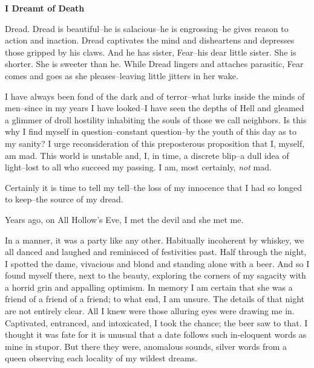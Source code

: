 \documentclass{article}
\begin{document}


\begin{center}
\large\textbf{I Dreamt of Death}
\end{center}



\noindent
Dread.
Dread is beautiful--he is salacious--he is engrossing--he
gives reason to action and inaction.
Dread captivates the mind and disheartens and depresses
those gripped by his claws.
And he has sister, Fear--his dear little sister.
She is shorter.  She is sweeter than he.
While Dread lingers and attaches parasitic,
Fear comes and goes as she pleases--leaving
little jitters in her wake.


I have always been fond of the dark and of terror--what
lurks inside the minds of men--since in my years
I have looked--I have seen the depths of Hell
and gleamed a glimmer of droll hostility
inhabiting the souls of those we call neighbors.
Is this why I find myself in question--constant question--by
the youth of this day as to my sanity?
I urge reconsideration of this preposterous proposition that
I, myself, am mad.
This world is unstable and, I, in time, a discrete blip--a
dull idea of light--lost to all who succeed my passing.
I am, most certainly, \textit{not} mad.
\VV


\noindent %
Certainly it is time to tell my tell--the
loss of my innocence that I had so longed to keep--the
source of my dread.
\VV


\noindent
Years ago, on All Hollow's Eve,
I met the devil and she met me.
\VV


\noindent
In a manner, it was a party like any other.
Habitually incoherent by whiskey,
we all danced and laughed and reminisced of festivities past.
Half through the night, I spotted the dame,
vivacious and blond and standing alone with a beer.
And so I found myself there, next to the beauty,
exploring the corners of my sagacity with a horrid
grin and appalling optimism.
In memory I am certain that she was a friend of
a friend of a friend; to what end, I am unsure.
The details of that night are not entirely clear.
All I knew were those alluring eyes were drawing me in.
Captivated, entranced, and intoxicated,
I took the chance; the beer saw to that.
I thought it was fate for it is unusual
that a date follows such in-eloquent words
as mine in stupor.
But there they were, anomalous sounds,
silver words from a queen observing each
locality of my wildest dreams.
\end{document}
